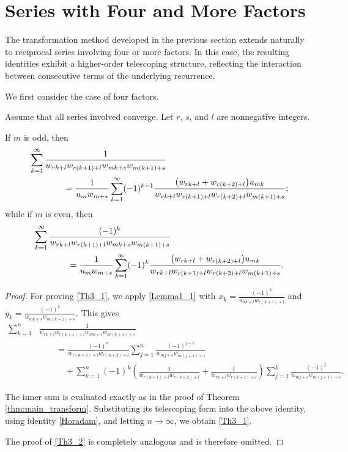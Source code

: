 \documentclass[12pt,reqno]{article}
\begin{document}
\section{Series with Four and More Factors}


The transformation method developed in the previous section extends naturally to reciprocal series involving four or more factors. In this case, the resulting identities exhibit a higher-order telescoping structure, reflecting the interaction between consecutive terms of the underlying recurrence.

We first consider the case of four factors.
\begin{theorem}\label{thm:four_factors}
	Assume that all series involved converge. Let $r$, $s$, and $l$ are nonnegative integers. 
	
	If $m$ is odd, then	
		\begin{align}\label{Th3_1}
		&\sum_{k=1}^\infty 
		\frac{1}{w_{rk+l}w_{r(k+1)+l}w_{mk+s}w_{m(k+1)+s}}\notag\\
		&\qquad\qquad= \frac{1}{u_m w_{m+s}}\sum_{k=1}^\infty (-1)^{k-1} \frac{\big(w_{rk+l}+w_{r(k+2)+l}\big)u_{mk}}
		{w_{rk+l} w_{r(k+1)+l} w_{r(k+2)+l} w_{m(k+1)+s}};
		\end{align}	
	while if $m$ is even, then	
		\begin{align}\label{Th3_2}
		&\sum_{k=1}^\infty 
		\frac{(-1)^k}{w_{rk+l}w_{r(k+1)+l}w_{mk+s}w_{m(k+1)+s}}\notag\\
		&\qquad\qquad = \frac{1}{u_m w_{m+s}}\sum_{k=1}^\infty (-1)^k \frac{\big(w_{rk+l}+w_{r(k+2)+l}\big)u_{mk}}
		{w_{rk+l} w_{r(k+1)+l} w_{r(k+2)+l} w_{m(k+1)+s}}.
		\end{align}	
\end{theorem}
\begin{proof}
	For proving \eqref{Th3_1}, we 	apply \eqref{Lemma1_1} 
	with
	$x_k=\frac{(-1)^k}{w_{rk+l}w_{r(k+1)+l}}$ and $y_k=\frac{(-1)^k}{w_{mk+s}w_{m(k+1)+s}}$.  This gives 
		\begin{align*}
		\sum_{k=1}^n &\frac{1}{w_{rk+l}w_{r(k+1)+l}w_{mk+s}w_{m(k+1)+s}}\\
		&\qquad=
		\frac{(-1)^{n}}{w_{r(n+1)+l}w_{r(n+2)+l}} \sum_{j=1}^n \frac{(-1)^{j-1}}{w_{mj+s}w_{m(j+1)+s}}\\
		&\qquad\quad +
		\sum_{k=1}^{n} (-1)^{k} \left(\frac{1}{w_{r(k+1)+l}w_{r(k+2)+l}}+\frac{1}{w_{rk+l}w_{r(k+1)+l}}\right) \sum_{j=1}^k  \frac{(-1)^j}{w_{mj+s}w_{m(j+1)+s}}.
		\end{align*}
	
	The inner sum is evaluated exactly as in the proof of Theorem \ref{thm:main_transform}. Substituting its telescoping form into the above identity, using identity \eqref{Horadam}, and letting $n\to\infty$, we obtain \eqref{Th3_1}.
	
	The proof of \eqref{Th3_2} is completely analogous and is therefore omitted.
\end{proof}
\end{document}
